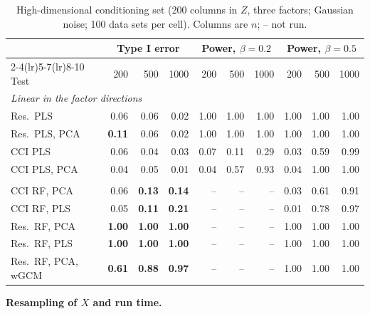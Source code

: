 \documentclass[10pt,leqno]{amsart}
\newcommand{\hi}[1]{\textbf{#1}}            %
\begin{document}
\begin{table}[H]
\caption{High-dimensional conditioning set (200 columns in $Z$, three factors; Gaussian noise; 100 data sets per cell). Columns are $n$; -- not run.}
\label{tab:highdim}
\scriptsize
\setlength{\tabcolsep}{2.5pt}
\begin{tabular}{l@{\hspace{6pt}}rrr@{\hspace{8pt}}rrr@{\hspace{8pt}}rrr}
\toprule
 & \multicolumn{3}{c}{Type I error} & \multicolumn{3}{c}{Power, $\beta=0.2$} & \multicolumn{3}{c}{Power, $\beta=0.5$} \\
\cmidrule(lr){2-4}\cmidrule(lr){5-7}\cmidrule(lr){8-10}
Test & 200 & 500 & 1000 & 200 & 500 & 1000 & 200 & 500 & 1000 \\
\midrule
\multicolumn{10}{l}{\emph{Linear in the factor directions}} \\
Res.\ PLS & 0.06 & 0.06 & 0.02 & 1.00 & 1.00 & 1.00 & 1.00 & 1.00 & 1.00 \\
Res.\ PLS, PCA & \hi{0.11} & 0.06 & 0.02 & 1.00 & 1.00 & 1.00 & 1.00 & 1.00 & 1.00 \\
CCI PLS & 0.06 & 0.04 & 0.03 & 0.07 & 0.11 & 0.29 & 0.03 & 0.59 & 0.99 \\
CCI PLS, PCA & 0.04 & 0.05 & 0.01 & 0.04 & 0.57 & 0.93 & 0.04 & 1.00 & 1.00 \\
\addlinespace
\multicolumn{10}{l}{\emph{Nonlinear (limit case)}} \\
CCI RF, PCA & 0.06 & \hi{0.13} & \hi{0.14} & -- & -- & -- & 0.03 & 0.61 & 0.91 \\
CCI RF, PLS & 0.05 & \hi{0.11} & \hi{0.21} & -- & -- & -- & 0.01 & 0.78 & 0.97 \\
Res.\ RF, PCA & \hi{1.00} & \hi{1.00} & \hi{1.00} & -- & -- & -- & 1.00 & 1.00 & 1.00 \\
Res.\ RF, PLS & \hi{1.00} & \hi{1.00} & \hi{1.00} & -- & -- & -- & 1.00 & 1.00 & 1.00 \\
Res.\ RF, PCA, wGCM & \hi{0.61} & \hi{0.88} & \hi{0.97} & -- & -- & -- & 1.00 & 1.00 & 1.00 \\
\bottomrule
\end{tabular}
\end{table}

\par\medskip\noindent\textbf{Resampling of $X$ and run time.}\par\nopagebreak
\end{document}
